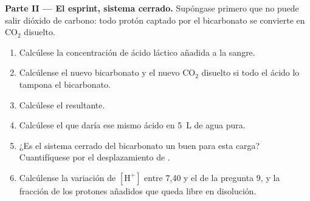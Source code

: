 \begin{problem}
\medskip
\noindent\textbf{Parte II --- El esprint, sistema cerrado.}
Supóngase primero que no puede salir dióxido de carbono: todo protón captado
por el bicarbonato se convierte en $\mathrm{CO_2}$ disuelto.
\begin{enumerate}[resume]
  \item Calcúlese la concentración de ácido láctico añadida a la sangre.
  \item Calcúlense el nuevo bicarbonato y el nuevo $\mathrm{CO_2}$ disuelto
        si todo el ácido lo tampona el bicarbonato.
  \item Calcúlese el  resultante.
  \item Calcúlese el  que daría ese mismo ácido en \qty{5}{L} de agua
        pura.
  \item ¿Es el sistema cerrado del bicarbonato un buen  para esta
        carga? Cuantifíquese por el desplazamiento de .
  \item Calcúlense la variación de $[\mathrm{H^+}]$ entre  7,40 y el 
        de la pregunta 9, y la fracción de los protones añadidos que queda
        libre en disolución.
\end{enumerate}


\end{problem}
